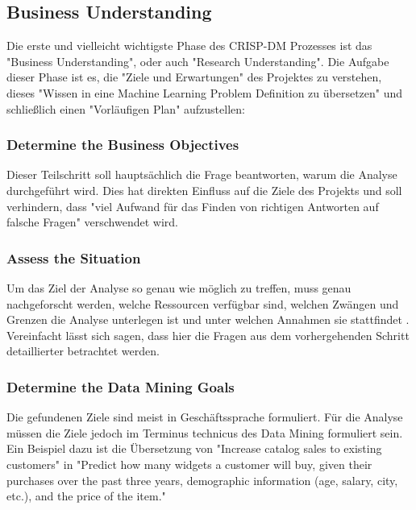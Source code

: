 \subsection{Business Understanding}
Die erste und vielleicht wichtigste Phase\citep[S.~14]{shearer_crisp-dm_2000} des CRISP-DM Prozesses ist das "Business Understanding", oder auch "Research Understanding"\citep[Punkt 1.4.1.1]{larose_discovering_2014}. Die Aufgabe dieser Phase ist es, die "Ziele und Erwartungen"\citep[S.~73]{swamynathan_mastering_2017} des Projektes zu verstehen, dieses "Wissen in eine Machine Learning Problem Definition zu übersetzen" und schließlich einen "Vorläufigen Plan"\citep[S.~14]{shearer_crisp-dm_2000} aufzustellen: 
\subsubsection{Determine the Business Objectives}
Dieser Teilschritt soll hauptsächlich die Frage beantworten, warum die Analyse durchgeführt wird. Dies hat direkten Einfluss auf die Ziele des Projekts und soll verhindern, dass "viel Aufwand für das Finden von richtigen Antworten auf falsche Fragen"\citep[S.~14]{chapman_crisp-dm_2000} verschwendet wird.
\subsubsection{Assess the Situation}
Um das Ziel der Analyse so genau wie möglich zu treffen, muss genau nachgeforscht werden, welche Ressourcen verfügbar sind, welchen Zwängen und Grenzen die Analyse unterlegen ist und unter welchen Annahmen sie stattfindet \citep[S.~14]{chapman_crisp-dm_2000}. Vereinfacht lässt sich sagen, dass hier die Fragen aus dem vorhergehenden Schritt detaillierter betrachtet werden.
\subsubsection{Determine the Data Mining Goals}
Die gefundenen Ziele sind meist in Geschäftssprache formuliert. Für die Analyse müssen die Ziele jedoch im Terminus technicus des Data Mining formuliert sein. Ein Beispiel dazu ist die Übersetzung von "Increase catalog sales to existing customers" in "Predict how many widgets a customer will buy, given their purchases over the
past three years, demographic information (age, salary, city, etc.), and the price of the item."\citep[S.~16]{chapman_crisp-dm_2000}
